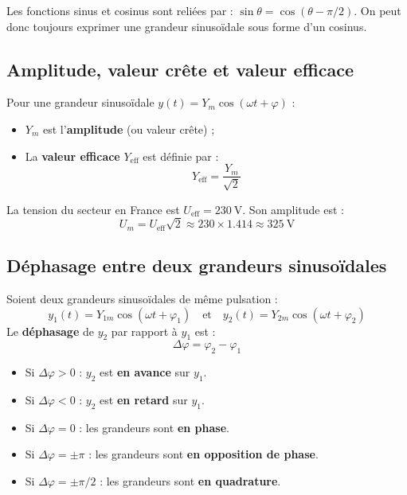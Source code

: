 \begin{remarque}
Les fonctions sinus et cosinus sont reliées par : $\sin\theta = \cos(\theta - \pi/2)$. On peut donc toujours exprimer une grandeur sinusoïdale sous forme d'un cosinus.
\end{remarque}

\subsection{Amplitude, valeur crête et valeur efficace}

\begin{definition}
Pour une grandeur sinusoïdale $y(t) = Y_m \cos(\omega t + \varphi)$ :
\begin{itemize}
\item $Y_m$ est l'\textbf{amplitude} (ou valeur crête) ;
\item La \textbf{valeur efficace} $Y_{\text{eff}}$ est définie par :
\[
Y_{\text{eff}} = \frac{Y_m}{\sqrt{2}}
\]
\end{itemize}
\end{definition}

\begin{exemple}
La tension du secteur en France est $U_{\text{eff}} = \SI{230}{\volt}$. Son amplitude est :
\[
U_m = U_{\text{eff}} \sqrt{2} \approx 230 \times 1.414 \approx \SI{325}{\volt}
\]
\end{exemple}

\subsection{Déphasage entre deux grandeurs sinusoïdales}

\begin{definition}[Déphasage]
Soient deux grandeurs sinusoïdales de même pulsation :
\[
y_1(t) = Y_{1m} \cos(\omega t + \varphi_1) \quad \text{et} \quad y_2(t) = Y_{2m} \cos(\omega t + \varphi_2)
\]
Le \textbf{déphasage} de $y_2$ par rapport à $y_1$ est :
\[
\Delta\varphi = \varphi_2 - \varphi_1
\]
\end{definition}

\begin{propriete}
\begin{itemize}
\item Si $\Delta\varphi > 0$ : $y_2$ est \textbf{en avance} sur $y_1$.
\item Si $\Delta\varphi < 0$ : $y_2$ est \textbf{en retard} sur $y_1$.
\item Si $\Delta\varphi = 0$ : les grandeurs sont \textbf{en phase}.
\item Si $\Delta\varphi = \pm\pi$ : les grandeurs sont \textbf{en opposition de phase}.
\item Si $\Delta\varphi = \pm\pi/2$ : les grandeurs sont \textbf{en quadrature}.
\end{itemize}
\end{propriete}

